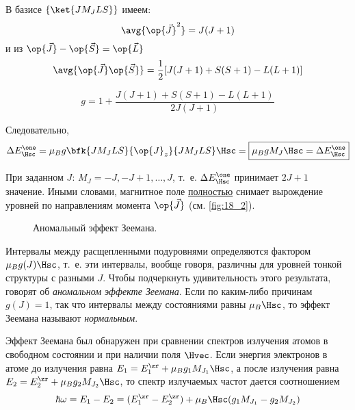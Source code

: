 В базисе $\{ \ket{J M_J L S}\}$ имеем: \newline
$$\avg{\op{\vec{J}}^2} = J(J+1)$$
и из $\op{\vec{J}} - \op{\vec{S}} = \op{\vec{L}}$
$$
\avg{\op{\vec{J}} \op{\vec{S}}} = \frac{1}{2}[J(J+1) + S(S+1) - L(L + 1)]
$$

\begin{equation}
\label{eq:18_6_3}
\boxed{g = 1 + \frac{J(J+1) + S(S + 1) - L(L + 1)}{2J(J+1)}}
\end{equation}

Следовательно,
\begin{equation}
\label{eq:18_6_4}
\Delta E_{\Hsc}^\one = \mu_B g \bfk{J M_J L S}{\op{J}_z}{J M_J L S} \Hsc = \boxed{\mu_B g M_J \Hsc = \Delta E_{\Hsc}^\one}
\end{equation}

При заданном $J$: $M_J = -J, -J + 1, \dots, J$, т.~е. $\Delta E_{\Hsc}^\one$ принимает $2J+1$ значение. Иными словами, магнитное поле \underline{полностью} снимает вырождение уровней по направлениям момента $\op{\vec{J}}$ (см. \autoref{fig:18_2}).
\begin{figure}[h!]
\centering
{}
\caption{Аномальный эффект Зеемана.} \label{fig:18_2}
\end{figure}

Интервалы между расщепленными подуровнями определяются фактором $\mu_B g(J) \Hsc$, т.~е. эти интервалы, вообще говоря, различны для уровней тонкой структуры с разными $J$. Чтобы подчеркнуть удивительность этого результата, говорят об {\em аномальном эффекте Зеемана}. Если по каким-либо причинам $g(J) = 1$, так что интервалы между состояниями равны $\mu_B \Hsc$, то эффект Зеемана называют {\em нормальным}.

Эффект Зеемана был обнаружен при сравнении спектров излучения атомов в свободном состоянии и при наличии поля $\Hvec$. Если энергия электронов в атоме до излучения равна $E_1 = E_1^\zr + \mu_B g_1 M_{J_1} \Hsc$, а после излучения равна $E_2 = E_2^\zr + \mu_B g_2 M_{J_2} \Hsc$, то спектр излучаемых частот дается соотношением
\begin{equation}
\label{eq:18_6_5}
\hbar \omega = E_1 - E_2 = (E_1^\zr -E_2^\zr)  + \mu_B \Hsc (g_1 M_{J_1} - g_2 M_{J_2})
\end{equation}

